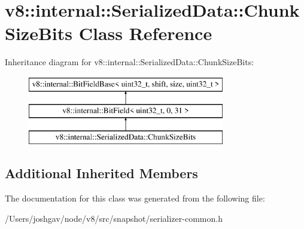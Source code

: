 \hypertarget{classv8_1_1internal_1_1_serialized_data_1_1_chunk_size_bits}{}\section{v8\+:\+:internal\+:\+:Serialized\+Data\+:\+:Chunk\+Size\+Bits Class Reference}
\label{classv8_1_1internal_1_1_serialized_data_1_1_chunk_size_bits}
Inheritance diagram for v8\+:\+:internal\+:\+:Serialized\+Data\+:\+:Chunk\+Size\+Bits\+:\begin{figure}[H]
\begin{center}
\leavevmode
\includegraphics[height=3.000000cm]{classv8_1_1internal_1_1_serialized_data_1_1_chunk_size_bits}
\end{center}
\end{figure}
\subsection*{Additional Inherited Members}


The documentation for this class was generated from the following file\+:\begin{DoxyCompactItemize}
\item 
/\+Users/joshgav/node/v8/src/snapshot/serializer-\/common.\+h\end{DoxyCompactItemize}
